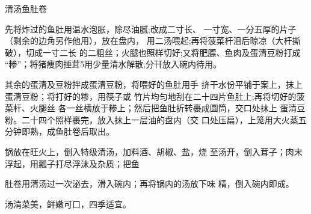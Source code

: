 \begin{recipe}{清汤鱼肚卷}

\ingredients



\cooking

\step 先将炸过的鱼肚用温水泡胀，除尽油腻;改成二寸长、 一寸宽、一分五厚的片子（剩余的边角另作他用），放在盘内， 用二汤喂起;再将菠菜杆沮后晾凉（大杆撕破），切成一寸二长 的二粗丝；火腿也照样切好;又将肥膘、鱼肉及蛋清豆粉打成 “糁”；将猪痩肉捶茸5用少量清水解散,分幵放入碗内待用。

\step 其余的蛋清及豆粉拌成蛋清豆粉，将喂好的鱼肚用手 挤干水份平铺于案上，抹上蛋清豆粉；将打好的糁，用筷子或 竹片均匀地刮在二十四片鱼肚上;再将切好的菠菜杆、火腿丝 各一丝横放于糁上；然后把鱼肚折转裹成圆筒，交口处抹上 蛋清豆粉。二十四个照样裹完，放入抹上一层油的盘内（交 口处压扁），上笼用大火蒸五分钟即熟，成鱼肚卷后取出。

\step 锅放在旺火上，倒入特级清汤，加料酒、胡椒、盐，烧 至汤开，倒入茸子；肉末浮起，用瓢子打尽浮沫及杂质；把鱼

肚卷用清汤过一次泌去，滑入碗内；再将锅内的汤放下味 精，倒入碗内即成。

\notes

汤清菜美，鲜嫩可口，四季适宜。

\end{recipe}

